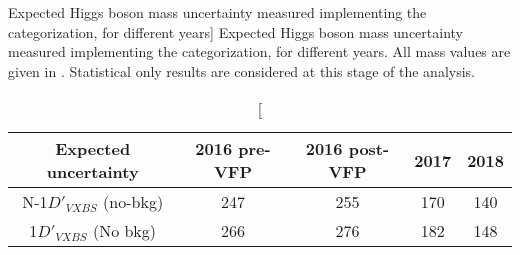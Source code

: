 \begin{table}[ht]	
\begin{center}
    \caption
        [Expected Higgs boson mass uncertainty measured implementing the categorization,
        for different years]
        {Expected Higgs boson mass uncertainty measured implementing the categorization,
        for different years.
        All mass values are given in \MeV.  
        Statistical only results are considered at this stage of the analysis.
        }
    \begin{tabular}{ccccc} %
        \hline			
    Expected uncertainty	&	2016 pre-VFP	&	2016 post-VFP	&	2017	&	2018	\\
        \hline			
        N-1$D'_{VXBS}$ (no-bkg)	&	247	&	255	&	170	&	140	\\
        1$D'_{VXBS}$ (No bkg)	&	266	&	276	&	182	&	148	\\
    \hline
    \end{tabular}
    \label{table:2D_model_result_year}
\end{center}
\end{table}
